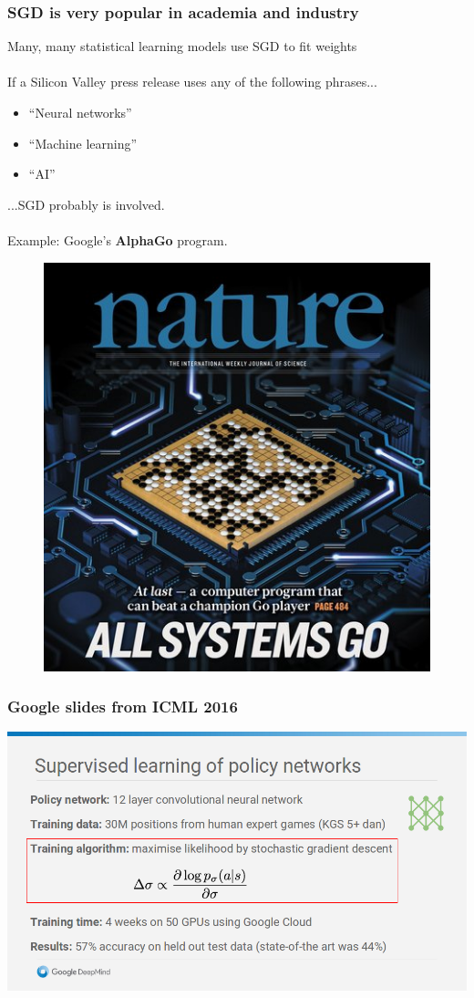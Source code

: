 \documentclass{beamer}
\begin{document}
\begin{frame}
	\frametitle{SGD is very popular in academia and industry}
	Many, many statistical learning models use SGD to fit weights \\~\\

	If a Silicon Valley press release uses any of the following phrases...
	\begin{itemize}
		\item \small ``Neural networks''
		\item ``Machine learning''
		\item ``AI'' 
	\end{itemize}

	...SGD probably is involved. \\~\\
	
	Example: Google's \textbf{AlphaGo} program.
\end{frame}

\begin{frame}
	\begin{figure}[b]
	\centering
	\includegraphics[scale=0.4]{go}
	\end{figure}
\end{frame}

\begin{frame}
	\frametitle{Google slides from ICML 2016}
	\centering
	\includegraphics[scale=0.3]{screenshot}
\end{frame}
\end{document}
